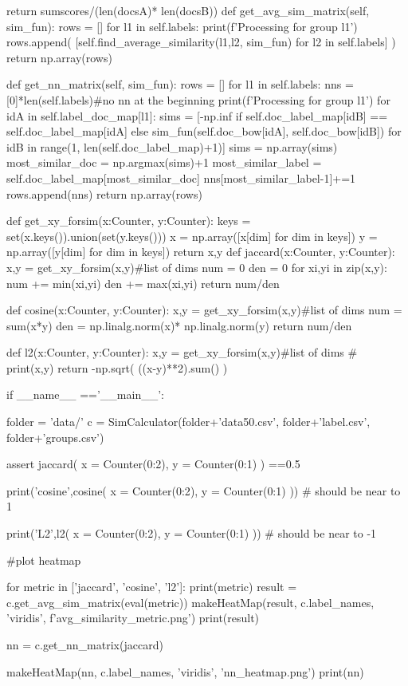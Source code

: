 \documentclass{homeworg}
\begin{document}
\begin{python}
        return sumscores/(len(docsA)* len(docsB))
    def get_avg_sim_matrix(self, sim_fun):
        rows = []
        for l1 in self.labels:
            print(f'Processing for group {l1}')
            rows.append(
                [self.find_average_similarity(l1,l2, sim_fun) for l2 in self.labels] 
            )
        return np.array(rows)

    def get_nn_matrix(self, sim_fun):
        rows = []
        for l1 in self.labels:
            nns = [0]*len(self.labels)#no nn at the beginning
            print(f'Processing for group {l1}')
            for idA in self.label_doc_map[l1]:
                sims = [-np.inf if self.doc_label_map[idB] == self.doc_label_map[idA] 
                            else sim_fun(self.doc_bow[idA], self.doc_bow[idB]) 
                            for idB in range(1, len(self.doc_label_map)+1)]
                sims = np.array(sims)
                most_similar_doc = np.argmax(sims)+1
                most_similar_label = self.doc_label_map[most_similar_doc]
                nns[most_similar_label-1]+=1
            rows.append(nns)
        return np.array(rows)

def get_xy_forsim(x:Counter, y:Counter):
    keys =  set(x.keys()).union(set(y.keys()))
    x = np.array([x[dim] for dim in keys])
    y = np.array([y[dim] for dim in keys])
    return x,y
def jaccard(x:Counter, y:Counter):
    x,y = get_xy_forsim(x,y)#list of dims
    num = 0
    den = 0
    for xi,yi in zip(x,y):
        num += min(xi,yi)
        den += max(xi,yi)
    return num/den

def cosine(x:Counter, y:Counter):
    x,y = get_xy_forsim(x,y)#list of dims
    num = sum(x*y)
    den = np.linalg.norm(x)* np.linalg.norm(y)
    return num/den

def l2(x:Counter, y:Counter):
    x,y = get_xy_forsim(x,y)#list of dims
    # print(x,y)
    return -np.sqrt(
        ((x-y)**2).sum()
    )

if __name__ =='__main__':

    folder = 'data/'
    c = SimCalculator(folder+'data50.csv', folder+'label.csv', folder+'groups.csv')

    assert jaccard(
        x = Counter({0:2}),
        y = Counter({0:1})
    ) ==0.5

    print('cosine',cosine(
        x = Counter({0:2}),
        y = Counter({0:1})
    )) # should be near to 1

    print('L2',l2(
        x = Counter({0:2}),
        y = Counter({0:1})
    )) # should be near to -1

    #plot heatmap

    for metric in ['jaccard', 'cosine', 'l2']:
        print(metric)
        result = c.get_avg_sim_matrix(eval(metric))
        makeHeatMap(result, c.label_names, 'viridis', f'avg_similarity_{metric}.png')
        print(result)

    nn = c.get_nn_matrix(jaccard)

    makeHeatMap(nn, c.label_names, 'viridis', 'nn_heatmap.png')
    print(nn)


\end{python}
\end{document}
